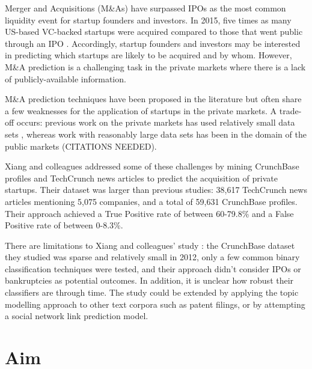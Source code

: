 \documentclass[12pt, a4paper]{article}
\begin{document}
Merger and Acquisitions (M\&As) have surpassed IPOs as the most common liquidity event for startup founders and investors. In 2015, five times as many US-based VC-backed startups were acquired compared to those that went public through an IPO \cite{nvca2016}. Accordingly, startup founders and investors may be interested in predicting which startups are likely to be acquired and by whom. However, M\&A prediction is a challenging task in the private markets where there is a lack of publicly-available information.

M\&A prediction techniques have been proposed in the literature but often share a few weaknesses for the application of startups in the private markets. A trade-off occurs: previous work on the private markets has used relatively small data sets \cite{wei2008, aliyrkko2005}, whereas work with reasonably large data sets has been in the domain of the public markets (CITATIONS NEEDED).

Xiang and colleagues \cite{xiang2012} addressed some of these challenges by mining CrunchBase profiles and TechCrunch news articles to predict the acquisition of private startups. Their dataset was larger than previous studies: 38,617 TechCrunch news articles mentioning 5,075 companies, and a total of 59,631 CrunchBase profiles. Their approach achieved a True Positive rate of between 60-79.8\% and a False Positive rate of between 0-8.3\%.

There are limitations to Xiang and colleagues' study \cite{xiang2012}: the CrunchBase dataset they studied was sparse and relatively small in 2012, only a few common binary classification techniques were tested, and their approach didn't consider IPOs or bankruptcies as potential outcomes. In addition, it is unclear how robust their classifiers are through time. The study could be extended by applying the topic modelling approach to other text corpora such as patent filings, or by attempting a social network link prediction model.

\section*{Aim}
\end{document}
